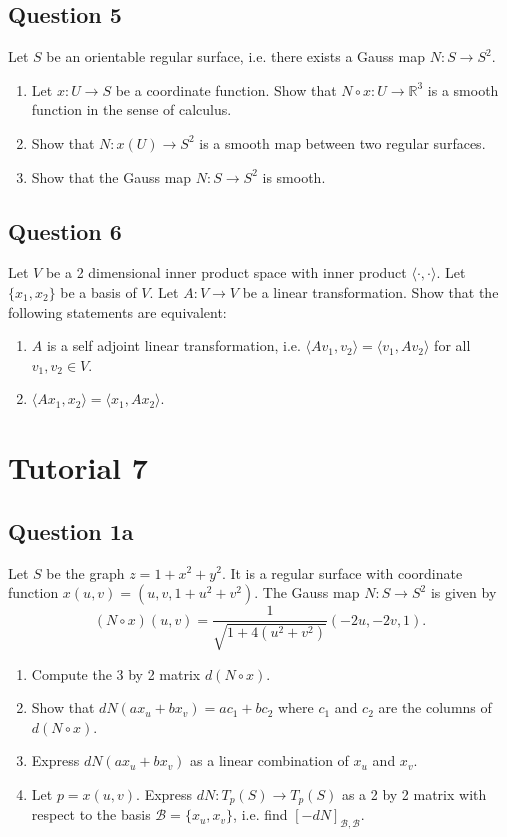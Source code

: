 \documentclass[12pt, a4paper]{article}
\newcommand{\R}{\mathbb{R}}
\newcommand{\inner}[1]{\langle #1 \rangle}
\begin{document}
\subsection*{Question 5}
Let $S$ be an orientable regular surface, i.e. there exists a Gauss map $N:S\rightarrow S^{2}$.
\begin{enumerate}[label=(\roman*)]
    \item Let $x:U\rightarrow S$ be a coordinate function. Show that $N\circ x:U\rightarrow\R^{3}$ is a smooth function in the sense of calculus.
    \item Show that $N:x(U)\rightarrow S^{2}$ is a smooth map between two regular surfaces.
    \item Show that the Gauss map $N: S\rightarrow S^{2}$ is smooth.
\end{enumerate}
\newpage

\subsection*{Question 6}
Let $V$ be a 2 dimensional inner product space with inner product $\inner{\cdot, \cdot}$. Let $\{x_{1},x_{2}\}$ be a basis of $V$. Let $A:V\rightarrow V$ be a linear transformation. Show that the following statements are equivalent:
\begin{enumerate}[label=(\roman*)]
    \item $A$ is a self adjoint linear transformation, i.e. $\inner{Av_{1},v_{2}}=\inner{v_{1},Av_{2}}$ for all $v_{1}, v_{2} \in V$.
    \item $\inner{Ax_{1},x_{2}}=\inner{x_{1},Ax_{2}}.$
\end{enumerate}
\newpage

\section*{Tutorial 7}

\subsection*{Question 1a}
Let $S$ be the graph $z=1+x^{2}+y^{2}$. It is a regular surface with coordinate function $x(u,v)=(u,v,1+u^{2}+v^{2})$. The Gauss map $N: S\rightarrow S^{2}$ is given by
\[ (N\circ x)(u,v)=\frac{1}{\sqrt{1+4(u^{2}+v^{2})}}(-2u,-2v,1). \]
\begin{enumerate}[label=(\roman*)]
    \item Compute the 3 by 2 matrix $d(N\circ x)$.
    \item Show that $dN(ax_{u}+bx_{v})=ac_{1}+bc_{2}$ where $c_{1}$ and $c_{2}$ are the columns of $d(N\circ x)$.
    \item Express $dN(ax_{u}+bx_{v})$ as a linear combination of $x_{u}$ and $x_{v}$.
    \item Let $p=x(u,v)$. Express $dN:T_{p}(S)\rightarrow T_{p}(S)$ as a 2 by 2 matrix with respect to the basis $\mathcal{B}=\{x_{u},x_{v}\}$, i.e. find $[-dN]_{\mathcal{B},\mathcal{B}}$.
\end{enumerate}
\end{document}
